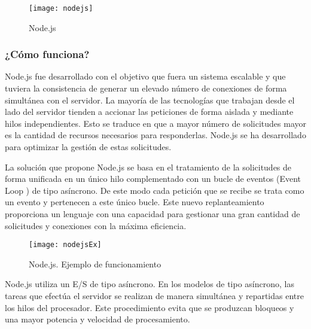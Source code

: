 \begin{figure}[h]
    \centering
    \texttt{[image: nodejs]}
    \caption{Node.js}
    \label{fig:nodejs}
\end{figure}

\subsubsection{¿Cómo funciona?}

Node.js fue desarrollado con el objetivo que fuera un sistema escalable y que tuviera la consistencia de generar un elevado número de conexiones de forma simultánea con el servidor. La mayoría de las tecnologías que trabajan desde el lado del servidor tienden a accionar las peticiones de forma aislada y mediante hilos independientes. Esto se traduce en que a mayor número de solicitudes mayor es la cantidad de recursos necesarios para responderlas. Node.js se ha desarrollado para optimizar la gestión de estas solicitudes.

La solución que propone Node.js se basa en el tratamiento de la solicitudes de forma unificada en un único hilo complementado con un bucle de eventos   (Event Loop \cite{URL::EventLoop}) de tipo asíncrono. De este modo cada petición que se recibe se trata como un evento y pertenecen a este único bucle. Este nuevo replanteamiento proporciona un lenguaje con una capacidad para gestionar una gran cantidad de solicitudes y conexiones con la máxima eficiencia.

\begin{figure}[h]
    \centering
    \texttt{[image: nodejsEx]}
    \caption{Node.js. Ejemplo de funcionamiento}
    \label{fig:nodejsEx}
\end{figure}

Node.js utiliza un E/S de tipo asíncrono. En los modelos de tipo asíncrono, las tareas que efectúa el servidor se realizan de manera simultánea y repartidas entre los hilos del procesador. Este procedimiento evita que se produzcan bloqueos y una mayor potencia y velocidad de procesamiento.

